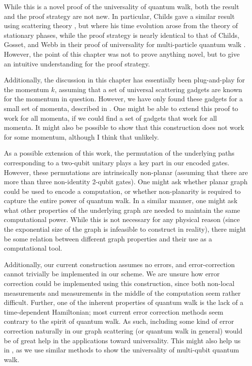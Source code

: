\documentclass[../thesis-main/thesis-main]{subfiles}
\begin{document}
While this is a novel proof of the universality of quantum walk, both the result and the proof strategy are not new.  In particular, Childs gave a similar result using scattering theory \cite{Chi09}, but where his time evolution arose from the theory of stationary phases, while the proof strategy is nearly identical to that of Childs, Gosset, and Webb in their proof of universality for multi-particle quantum walk \cite{MPQW}.  However, the point of this chapter was not to prove anything novel, but to give an intuitive understanding for the proof strategy.

Additionally, the discussion in this chapter has essentially been plug-and-play for the momentum $k$, assuming that a set of universal scattering gadgets are known for the momentum in question.  However, we have only found these gadgets for a small set of momenta, described in .  One might be able to extend this proof to work for all momenta, if we could find a set of gadgets that work for all momenta.  It might also be possible to show that this construction does not work for some momentum, although I think that unlikely.

As a possible extension of this work, the permutation of the underlying paths corresponding to a two-qubit unitary plays a key part in our encoded gates.  However, these permutations are intrinsically non-planar (assuming that there are more than three non-identity 2-qubit gates).  One might ask whether  planar graph could be used to encode a computation, or whether non-planarity is required to capture the entire power of quantum walk.  In a similar manner, one might ask what other properties of the underlying graph are needed to maintain the same computational power.  While this is not necessary for any physical reason (since the exponential size of the graph is infeasible to construct in reality), there might be some relation between different graph properties and their use as a computational tool.

Additionally, our current construction assumes no errors, and error-correction cannot trivially be implemented in our scheme.  We are unsure how error correction could be implemented using this construction, since both non-local measurements and measurements in the middle of the computation seem rather difficult.  Further, one of the inherent properties of quantum walk is the lack of a time-dependent Hamiltonian; most current error correction methods seem contrary to the spirit of quantum walk.  As such, including some kind of error correction naturally in our graph scattering (or quantum walk in general) would be of great help in the applications toward universality.  This might also help us in , as we use similar methods to show the universality of multi-qubit quantum walk.


\biblio
\end{document}
